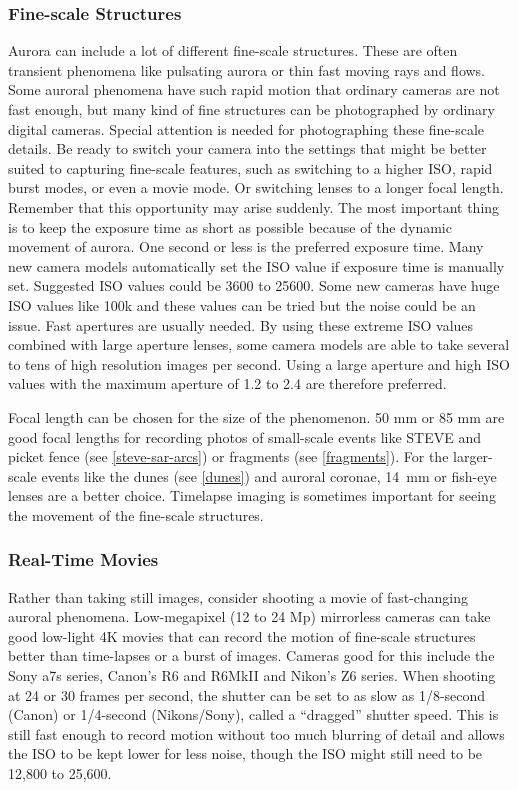 \documentclass{article}
\begin{document}
\subsubsection{Fine-scale Structures}

Aurora can include a lot of different fine-scale structures. These are often transient phenomena like pulsating aurora or thin fast moving rays and flows. Some auroral phenomena have such rapid motion that ordinary cameras are not fast enough, but many kind of fine structures can be photographed by ordinary digital cameras. Special attention is needed for photographing these fine-scale details. Be ready to switch your camera into the settings that might be better suited to capturing fine-scale features, such as switching to a higher ISO, rapid burst modes, or even a movie mode. Or switching lenses to a longer focal length. Remember that this opportunity may arise suddenly. The most important thing is to keep the exposure time as short as possible because of the dynamic movement of aurora. One second or less is the preferred exposure time. Many new camera models automatically set the ISO value if exposure time is manually set. Suggested ISO values could be 3600 to 25600. Some new cameras have huge ISO values like 100k and these values can be tried but the noise could be an issue. Fast apertures are usually needed. By using these extreme ISO values combined with large aperture lenses, some camera models are able to take several to tens of high resolution images per second. Using a large aperture and high ISO values with the maximum aperture of 1.2 to 2.4 are therefore preferred. 

Focal length can be chosen for the size of the phenomenon. 50 mm or 85 mm are good focal lengths for recording photos of small-scale events like STEVE and picket fence (see \ref{steve-sar-arcs}) or fragments (see \ref{fragments}). For the larger-scale events like the dunes (see \ref{dunes}) and auroral coronae, 14~mm or fish-eye lenses are a better choice. Timelapse imaging is sometimes important for seeing the movement of the fine-scale structures.


\subsubsection{Real-Time Movies}
Rather than taking still images, consider shooting a movie of fast-changing auroral phenomena. Low-megapixel (12 to 24 Mp) mirrorless cameras can take good low-light 4K movies that can record the motion of fine-scale structures better than time-lapses or a burst of images. Cameras good for this include the Sony a7s series, Canon's R6 and R6MkII and Nikon's Z6 series. When shooting at 24 or 30 frames per second, the shutter can be set to as slow as 1/8-second (Canon) or 1/4-second (Nikons/Sony), called a ``dragged'' shutter speed. This is still fast enough to record motion without too much blurring of detail and allows the ISO to be kept lower for less noise, though the ISO might still need to be 12,800 to 25,600. 
\end{document}
